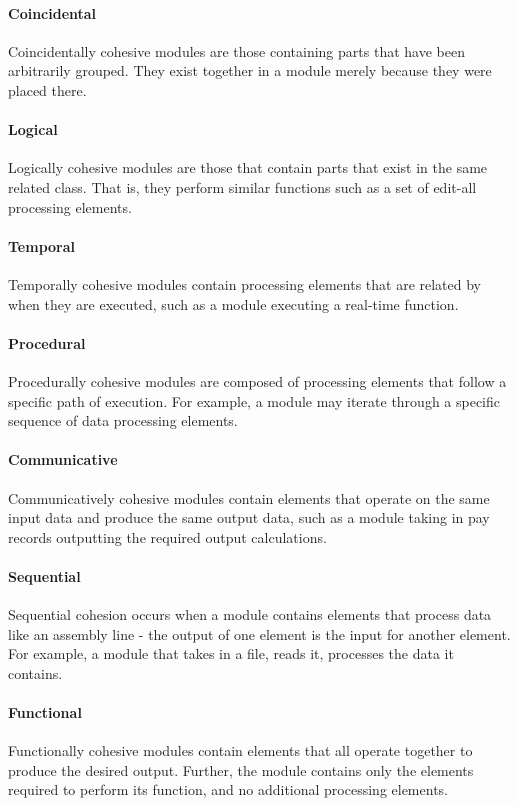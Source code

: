 \documentclass{article}
\begin{document}
			\paragraph{Coincidental} Coincidentally cohesive modules are those containing parts that have been arbitrarily grouped. They exist together in a module merely because they were placed there. 
			\paragraph{Logical} Logically cohesive modules are those that contain parts that exist in the same related class. That is, they perform similar functions such as a set of edit-all processing elements. 
			\paragraph{Temporal} Temporally cohesive modules contain processing elements that are related by when they are executed, such as a module executing a real-time function. 
			\paragraph{Procedural} Procedurally cohesive modules are composed of processing elements that follow a specific path of execution. For example, a module may iterate through a specific sequence of data processing elements. 
			\paragraph{Communicative} Communicatively cohesive modules contain elements that operate on the same input data and produce the same output data, such as a module taking in pay records outputting the required output calculations. 
			\paragraph{Sequential} Sequential cohesion occurs when a module contains elements that process data like an assembly line - the output of one element is the input for another element. For example, a module that takes in a file, reads it, processes the data it contains. 
			\paragraph{Functional} Functionally cohesive modules contain elements that all operate together to produce the desired output. Further, the module contains only the elements required to perform its function, and no additional processing elements. 
\end{document}
